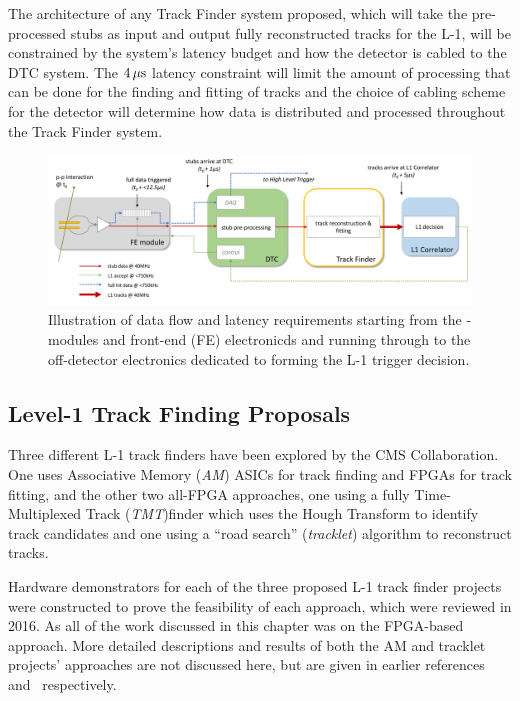 The architecture of any Track Finder system proposed, which will take the pre-processed stubs as input and output fully reconstructed tracks for the L-1, will be constrained by the system's latency budget and how the detector is cabled to the DTC system.
The $4\,\mu\text{s}$ latency constraint will limit the amount of processing that can be done for the finding and fitting of tracks and the choice of cabling scheme for the detector will determine how data is distributed and processed throughout the Track Finder system.

\begin{figure}[tb]
\centering
\includegraphics[width=\textwidth]{figs/tk-upgrade/dataflow.pdf}
\caption{Illustration of data flow and latency requirements starting from the \pt-modules and front-end (FE) electronicds and running through to the off-detector electronics dedicated to forming the L-1 trigger decision.}
\label{fig:dataFlow}
\end{figure}

\subsection{Level-1 Track Finding Proposals}\label{subsec:TrackFinderReview}

Three different L-1 track finders have been explored by the CMS Collaboration.
One uses Associative Memory (\emph{AM}) ASICs for track finding and FPGAs for track fitting, and the other two all-FPGA approaches, one using a fully Time-Multiplexed Track (\emph{TMT})finder which uses the Hough Transform to identify track candidates and one using a ``road search'' (\emph{tracklet}) algorithm to reconstruct tracks.

Hardware demonstrators for each of the three proposed L-1 track finder projects were constructed to prove the feasibility of each approach, which were reviewed in 2016.
As all of the work discussed in this chapter was on the FPGA-based \HT approach.
More detailed descriptions and results of both the AM and tracklet projects' approaches are not discussed here, but are given in earlier references~\cite{P2TrackerTDR,AM} and~\cite{P2TrackerTDR,tracklet} respectively.

